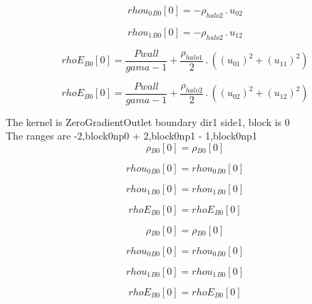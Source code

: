 \documentclass{article}
\begin{document}
\begin{dmath}{rhou_{0}{_{B0}}}[{0}] = - \rho_{halo 2} \,.\, u_{02}\end{dmath}

\begin{dmath}{rhou_{1}{_{B0}}}[{0}] = - \rho_{halo 2} \,.\, u_{12}\end{dmath}

\begin{dmath}{rhoE{_{B0}}}[{0}] = \frac{Pwall}{gama - 1} + \frac{\rho_{halo 1}}{2} \,.\, \left(\left(u_{01} \right)^{2} + \left(u_{11} \right)^{2}\right)\end{dmath}

\begin{dmath}{rhoE{_{B0}}}[{0}] = \frac{Pwall}{gama - 1} + \frac{\rho_{halo 2}}{2} \,.\, \left(\left(u_{02} \right)^{2} + \left(u_{12} \right)^{2}\right)\end{dmath}

\noindent The kernel is ZeroGradientOutlet boundary dir1 side1, block is 0\\\noindent The ranges are -2,block0np0 + 2,block0np1 - 1,block0np1\\\begin{dmath}{\rho{_{B0}}}[{0}] = {\rho{_{B0}}}[{0}]\end{dmath}

\begin{dmath}{rhou_{0}{_{B0}}}[{0}] = {rhou_{0}{_{B0}}}[{0}]\end{dmath}

\begin{dmath}{rhou_{1}{_{B0}}}[{0}] = {rhou_{1}{_{B0}}}[{0}]\end{dmath}

\begin{dmath}{rhoE{_{B0}}}[{0}] = {rhoE{_{B0}}}[{0}]\end{dmath}

\begin{dmath}{\rho{_{B0}}}[{0}] = {\rho{_{B0}}}[{0}]\end{dmath}

\begin{dmath}{rhou_{0}{_{B0}}}[{0}] = {rhou_{0}{_{B0}}}[{0}]\end{dmath}

\begin{dmath}{rhou_{1}{_{B0}}}[{0}] = {rhou_{1}{_{B0}}}[{0}]\end{dmath}

\begin{dmath}{rhoE{_{B0}}}[{0}] = {rhoE{_{B0}}}[{0}]\end{dmath}
\end{document}
